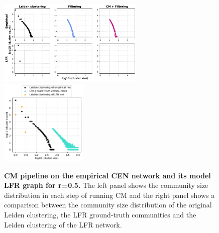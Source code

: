\documentclass[a4paper]{article}   	%
\begin{document}
\begin{figure}[h!]
\centering
\includegraphics[width=0.62\textwidth]{figs/cen_cm_steps_lfr5.pdf}
\includegraphics[width=0.37\textwidth]{figs/cen_5_cm_size.pdf}
\caption[CM pipeline on the empirical CEN network and its model LFR graph for r=0.5]{\textbf{CM pipeline on the empirical CEN network and its model LFR graph for r=0.5.} The left panel shows the community size distribution in each step of running CM and the right panel shows a comparison between the community size distribution of the original Leiden clustering, the LFR ground-truth communities and the Leiden clustering of the LFR network.}
\label{fig:cen-cm-lfr-5}
\end{figure}
\end{document}
